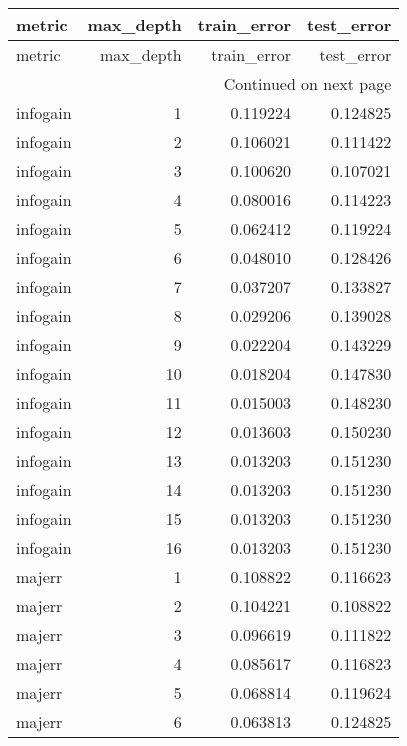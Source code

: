 \begin{longtable}{lrrr}
\toprule
  metric &  max\_depth &  train\_error &  test\_error \\
\midrule
\endfirsthead

\toprule
  metric &  max\_depth &  train\_error &  test\_error \\
\midrule
\endhead
\midrule
\multicolumn{4}{r}{{Continued on next page}} \\
\midrule
\endfoot

\bottomrule
\endlastfoot
infogain &          1 &     0.119224 &    0.124825 \\
infogain &          2 &     0.106021 &    0.111422 \\
infogain &          3 &     0.100620 &    0.107021 \\
infogain &          4 &     0.080016 &    0.114223 \\
infogain &          5 &     0.062412 &    0.119224 \\
infogain &          6 &     0.048010 &    0.128426 \\
infogain &          7 &     0.037207 &    0.133827 \\
infogain &          8 &     0.029206 &    0.139028 \\
infogain &          9 &     0.022204 &    0.143229 \\
infogain &         10 &     0.018204 &    0.147830 \\
infogain &         11 &     0.015003 &    0.148230 \\
infogain &         12 &     0.013603 &    0.150230 \\
infogain &         13 &     0.013203 &    0.151230 \\
infogain &         14 &     0.013203 &    0.151230 \\
infogain &         15 &     0.013203 &    0.151230 \\
infogain &         16 &     0.013203 &    0.151230 \\
  majerr &          1 &     0.108822 &    0.116623 \\
  majerr &          2 &     0.104221 &    0.108822 \\
  majerr &          3 &     0.096619 &    0.111822 \\
  majerr &          4 &     0.085617 &    0.116823 \\
  majerr &          5 &     0.068814 &    0.119624 \\
  majerr &          6 &     0.063813 &    0.124825 \\

\end{longtable}
